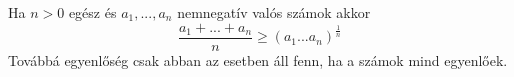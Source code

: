    Ha $n>0$ egész és $a_{1},...,a_{n}$ nemnegatív valós számok akkor
   $$
   \frac{a_{1}+...+a_{n}}{n} \ge (a_{1}...a_{n})^{\frac{1}{n}}
   $$
   Továbbá egyenlőség csak abban az esetben áll fenn, ha a számok mind egyenlőek.
